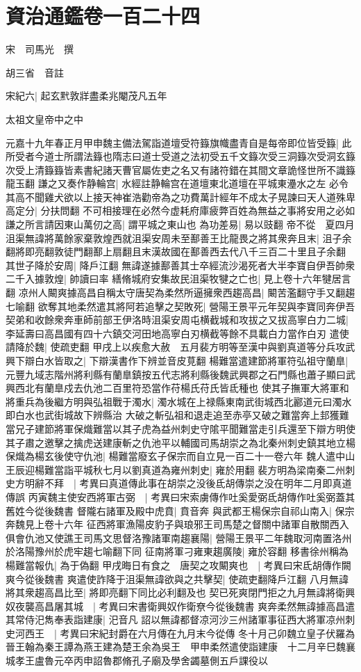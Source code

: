 \section{資治通鑑卷一百二十四}
宋　司馬光　撰

胡三省　音註

宋紀六|{
	起玄黓敦牂盡柔兆閹茂凡五年}


太祖文皇帝中之中

元嘉十九年春正月甲申魏主備法駕詣道壇受符籙旗幟盡青自是每帝即位皆受籙|{
	此所受者今道士所謂法籙也隋志曰道士受道之法初受五千文籙次受三洞籙次受洞玄籙次受上清籙籙皆素書紀諸天曹官屬佐吏之名又有諸符錯在其間文章詭怪世所不識籙龍玉翻}
謙之又奏作静輪宫|{
	水經註静輪宫在道壇東北道壇在平城東灅水之左}
必令其高不聞雞犬欲以上接天神崔浩勸帝為之功費萬計經年不成太子晃諫曰天人道殊卑高定分|{
	分扶問翻}
不可相接理在必然今虚耗府庫疲弊百姓為無益之事將安用之必如謙之所言請因東山萬仞之高|{
	謂平城之東山也}
為功差易|{
	易以豉翻}
帝不從　夏四月沮渠無諱將萬餘家棄敦煌西就沮渠安周未至鄯善王比龍畏之將其衆奔且末|{
	沮子余翻將即亮翻敦徒門翻鄯上扇翻且末漢故國在鄯善西去代八千三百二十里且子余翻}
其世子降於安周|{
	降戶江翻}
無諱遂據鄯善其士卒經流沙渴死者大半李寶自伊吾帥衆二千入據敦煌|{
	帥讀曰率}
繕脩城府安集故民沮渠牧犍之亡也|{
	見上卷十六年犍居言翻}
凉州人闞爽據高昌自稱太守唐契為柔然所逼擁衆西趨高昌|{
	闞苦濫翻守手又翻趨七喻翻}
欲奪其地柔然遣其將阿若追擊之契敗死|{
	營陽王景平元年契與李寶同奔伊吾}
契弟和收餘衆奔車師前部王伊洛時沮渠安周屯横截城和攻拔之又拔高寧白力二城|{
	李延壽曰高昌國有四十六鎮交河田地高寧白刃横截等餘不具載白力當作白刃}
遣使請降於魏|{
	使疏吏翻}
甲戌上以疾愈大赦　五月裴方明等至漢中與劉真道等分兵攻武興下辯白水皆取之|{
	下辯漢書作下辨並音皮莧翻}
楊難當遣建節將軍符弘祖守蘭臯|{
	元豐九域志階州將利縣有蘭臯鎮按五代志將利縣後魏武興郡之石門縣也蕭子顯曰武興西北有蘭臯戍去仇池二百里符恐當作苻楊氏苻氏皆氐種也}
使其子撫軍大將軍和將重兵為後繼方明與弘祖戰于濁水|{
	濁水城在上禄縣東南武街城西北酈道元曰濁水即白水也武街城故下辨縣治}
大破之斬弘祖和退走追至赤亭又破之難當奔上邽獲難當兄子建節將軍保熾難當以其子虎為益州刺史守隂平聞難當走引兵還至下辯方明使其子肅之邀擊之擒虎送建康斬之仇池平以輔國司馬胡崇之為北秦州刺史鎮其地立楊保熾為楊玄後使守仇池|{
	楊難當廢玄子保宗而自立見一百二十一卷六年}
魏人遣中山王辰迎楊難當詣平城秋七月以劉真道為雍州刺史|{
	雍於用翻}
裴方明為梁南秦二州刺史方明辭不拜　|{
	考異曰真道傳此事在胡崇之没後氐胡傳崇之没在明年二月即真道傳誤}
丙寅魏主使安西將軍古弼　|{
	考異曰宋索虜傳作吐奚愛弼氐胡傳作吐奚弼蓋其舊姓今從後魏書}
督隴右諸軍及殿中虎賁|{
	賁音奔}
與武都王楊保宗自祁山南入|{
	保宗奔魏見上卷十六年}
征西將軍漁陽皮豹子與琅邪王司馬楚之督關中諸軍自散關西入俱會仇池又使譙王司馬文思督洛豫諸軍南趨襄陽|{
	營陽王景平二年魏取河南置洛州於洛陽豫州於虎牢趨七喻翻下同}
征南將軍刁雍東趨廣陵|{
	雍於容翻}
移書徐州稱為楊難當報仇|{
	為于偽翻}
甲戌晦日有食之　唐契之攻闞爽也　|{
	考異曰宋氐胡傳作闕爽今從後魏書}
爽遣使詐降于沮渠無諱欲與之共擊契|{
	使疏吏翻降戶江翻}
八月無諱將其衆趨高昌比至|{
	將即亮翻下同比必利翻及也}
契已死爽閉門拒之九月無諱將衛興奴夜襲高昌屠其城　|{
	考異曰宋書衛興奴作衛尞今從後魏書}
爽奔柔然無諱據高昌遣其常侍汜雋奉表詣建康|{
	汜音凡}
詔以無諱都督凉河沙三州諸軍事征西大將軍凉州刺史河西王　|{
	考異曰宋紀封爵在六月傳在九月末今從傳}
冬十月己卯魏立皇子伏羅為晉王翰為秦王譚為燕王建為楚王余為吳王　甲申柔然遣使詣建康　十二月辛巳魏襄城孝王盧魯元卒丙申詔魯郡脩孔子廟及學舍蠲墓側五戶課役以

